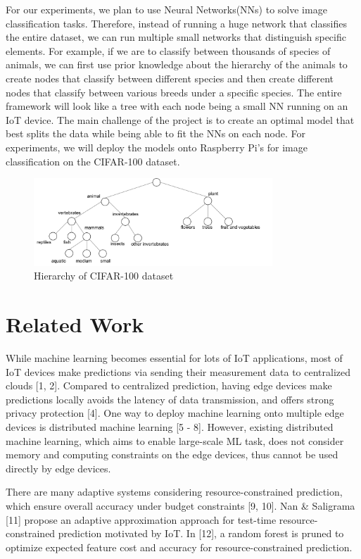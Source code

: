 \documentclass{article}
\begin{document}
For our experiments, we plan to use Neural Networks(NNs) to solve image classification tasks. Therefore, instead of running a huge network that classifies the entire dataset, we can run multiple small networks that distinguish specific elements. For example, if we are to classify between thousands of species of animals, we can first use prior knowledge about the hierarchy of the animals to create nodes that classify between different species and then create different nodes that classify between various breeds under a specific species. The entire framework will look like a tree with each node being a small NN running on an IoT device. The main challenge of the project is to create an optimal model that best splits the data while being able to fit the NNs on each node. For experiments, we will deploy the models onto Raspberry Pi’s for image classification on the CIFAR-100 dataset.

\begin{figure}[ht]
  \centering
  \includegraphics[width=0.8\textwidth]{cifar100.png}
  \caption{Hierarchy of CIFAR-100 dataset}
\end{figure}

\section{Related Work}
While machine learning becomes essential for lots of IoT applications, most of IoT devices make predictions via sending their measurement data to centralized clouds [1, 2]. Compared to centralized prediction, having edge devices make predictions locally avoids the latency of data transmission, and offers strong privacy protection [4]. One way to deploy machine learning onto multiple edge devices is distributed machine learning [5 - 8]. However, existing distributed machine learning, which aims to enable large-scale ML task, does not consider memory and computing constraints on the edge devices, thus cannot be used directly by edge devices. 

There are many adaptive systems considering resource-constrained prediction, which ensure overall accuracy under budget constraints [9, 10]. Nan \& Saligrama [11] propose an adaptive approximation approach for test-time resource-constrained prediction motivated by IoT. In [12], a random forest is pruned to optimize expected feature cost and accuracy for resource-constrained prediction. 
\end{document}
